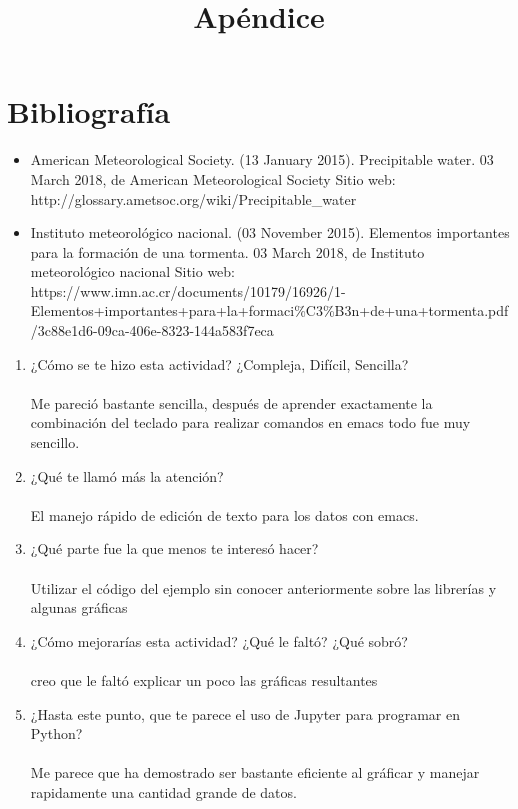 \documentclass{article}
\begin{document}
\newpage

\section{Bibliografía}
\begin{itemize}
\item American Meteorological Society. (13 January 2015). Precipitable water. 03 March 2018, de American Meteorological Society Sitio web: \\http://glossary.ametsoc.org/wiki/Precipitable\_water
\item Instituto meteorológico nacional. (03 November 2015). Elementos importantes para la formación de una tormenta. 03 March 2018, de Instituto meteorológico nacional Sitio web: https://www.imn.ac.cr/documents/10179/16926/1-Elementos+importantes+para+la+formaci\%C3\%B3n+de+una+tormenta.pdf/3c88e1d6-09ca-406e-8323-144a583f7eca
\end{itemize}

\newpage

\title{Apéndice}

\begin{enumerate}
\item ¿Cómo se te hizo esta actividad? ¿Compleja, Difícil, Sencilla? ~\\~\\
Me pareció bastante sencilla, después de aprender exactamente la combinación del teclado para realizar comandos en emacs todo fue muy sencillo.

\item ¿Qué te llamó más la atención?~\\~\\
El manejo rápido de edición de texto para los datos con emacs.

\item ¿Qué parte fue la que menos te interesó hacer?~\\~\\
Utilizar el código del ejemplo sin conocer anteriormente sobre las librerías y algunas gráficas

\item ¿Cómo mejorarías esta actividad? ¿Qué le faltó? ¿Qué sobró?  ~\\~\\
creo que le faltó explicar un poco las gráficas resultantes

\item ¿Hasta este punto, que te parece el uso de Jupyter para programar en Python?  ~\\~\\
Me parece que ha demostrado ser bastante eficiente al gráficar y manejar rapidamente una cantidad grande de datos.

\end{enumerate}
\end{document}
